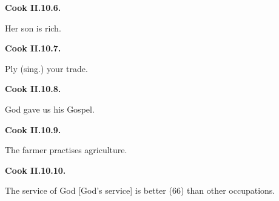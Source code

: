 \par\begin{minipage}{\linewidth}\raggedright
\textbf{Cook II.10.6.}

Her son is rich.

\end{minipage}\par\addvspace{4pt}

\par\begin{minipage}{\linewidth}\raggedright
\textbf{Cook II.10.7.}

Ply (sing.) your trade.

\end{minipage}\par\addvspace{4pt}

\par\begin{minipage}{\linewidth}\raggedright
\textbf{Cook II.10.8.}

God gave us his Gospel.

\end{minipage}\par\addvspace{4pt}

\par\begin{minipage}{\linewidth}\raggedright
\textbf{Cook II.10.9.}

The farmer practises agriculture.

\end{minipage}\par\addvspace{4pt}

\par\begin{minipage}{\linewidth}\raggedright
\textbf{Cook II.10.10.}

The service of God [God’s service] is better (66) than other occupations.

\end{minipage}\par\addvspace{4pt}

